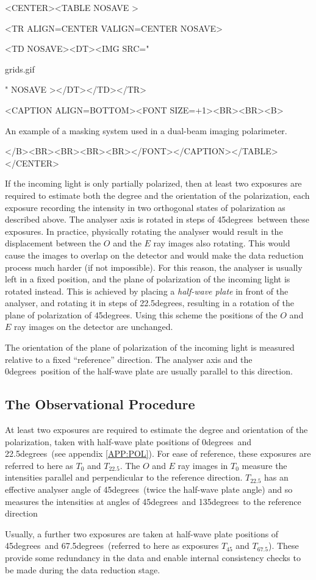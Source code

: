\documentclass[twoside,11pt]{article}
\newcommand{\hyperref}[4]{#2\ref{#4}#3}
\newcommand{\xlabel}[1]{}
\renewcommand{\_}{\texttt{\symbol{95}}}
\newcommand{\htmlfig}[3]{
   \label{#1}
   \begin{rawhtml} <CENTER><TABLE NOSAVE > \end{rawhtml}
   \begin{rawhtml} <TR ALIGN=CENTER VALIGN=CENTER NOSAVE> \end{rawhtml}
   \begin{rawhtml} <TD NOSAVE><DT><IMG SRC=" \end{rawhtml}
   #2
   \begin{rawhtml} " NOSAVE ></DT></TD></TR> \end{rawhtml}
   \begin{rawhtml} <CAPTION ALIGN=BOTTOM><FONT SIZE=+1><BR><BR><B> \end{rawhtml}
   #3 
   \begin{rawhtml} </B><BR><BR><BR><BR></FONT></CAPTION></TABLE></CENTER> \end{rawhtml}
}
\newcommand{\dgs}{\hbox{$^\circ$}}
\renewcommand{\dgs}{degrees}
\begin{document}
\begin{htmlonly}
\htmlfig{fig:grids}{grids.gif}{An example of a masking system used in 
a dual-beam imaging polarimeter.}
\end{htmlonly}

If the incoming light is only partially polarized, then at least two
exposures are required to estimate both the degree and the orientation of
the polarization, each exposure recording the intensity in two orthogonal
states of polarization as described above. The analyser axis is rotated
in steps of 45\dgs\ between these exposures. In practice, physically rotating
the analyser would result in the displacement between the $O$ and
the $E$ ray images also rotating. This would cause the images to overlap
on the detector and would make the data reduction process much harder (if
not impossible). For this reason, the analyser is usually left in a fixed
position, and the plane of polarization of the incoming light is rotated
instead. This is achieved by placing a \emph{half-wave plate} in
front of the analyser, and rotating it in steps of 22.5\dgs, resulting in
a rotation of the plane of polarization of 45\dgs. Using this scheme the
positions of the $O$ and $E$ ray images on the detector are unchanged.

The orientation of the plane of polarization of the incoming light is
measured relative to a fixed ``reference'' direction. The analyser axis
and the 0\dgs\ position of the half-wave plate are usually parallel to
this direction. 

\subsection{\label{SEC:OBS}\xlabel{theobservationalprocedure}The Observational Procedure}
At least two exposures are required to estimate the degree and
orientation of the polarization, taken with half-wave plate positions of
0\dgs\ and 22.5\dgs\ (see \hyperref{here}{appendix }{}{APP:POL}). For ease
of reference, these exposures are referred to here as $T_{0}$ and
$T_{22.5}$. The $O$ and $E$ ray images in $T_{0}$ measure the intensities
parallel and perpendicular to the reference direction. $T_{22.5}$ has an
effective analyser angle of 45\dgs\ (twice the half-wave plate angle) and
so measures the intensities at angles of 45\dgs\ and 135\dgs\ to the
reference direction

Usually, a further two exposures are taken at half-wave plate positions
of 45\dgs\ and 67.5\dgs\ (referred to here as exposures $T_{45}$ and
$T_{67.5}$). These provide some redundancy in the data and enable
internal consistency checks to be made during the data reduction stage.
\end{document}
